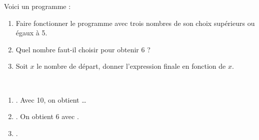 \begin{exercice}
    Voici un programme :
    \begin{enumerate}
       \item Faire fonctionner le programme avec trois nombres de son choix supérieurs ou égaux à 5.
       \item Quel nombre faut-il choisir pour obtenir 6 ?
       \item Soit $x$ le nombre de départ, donner l'expression finale en fonction de $x$.
    \end{enumerate}
 \end{exercice}
 
 \begin{corrige}
    \ \\ [-5mm]
    \begin{enumerate}
       \item {}. Avec 10, on obtient {} \dots
       \item {}. On obtient 6 avec {}.
       \item {}.
    \end{enumerate}
 \end{corrige}
